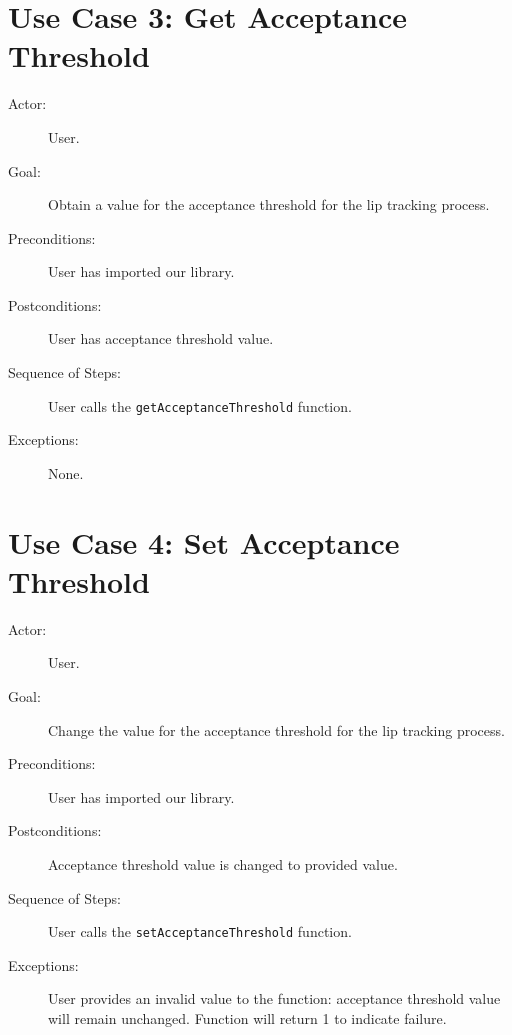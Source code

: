 \section{Use Case 3: Get Acceptance Threshold}

\begin{description}
  \item[Actor:] User.
  \item[Goal:] Obtain a value for the acceptance threshold for the lip tracking process.
  \item[Preconditions:] User has imported our library.
  \item[Postconditions:] User has acceptance threshold value.
  \item[Sequence of Steps:] User calls the \texttt{getAcceptanceThreshold} function.
  \item[Exceptions:] None.
\end{description}


\section{Use Case 4: Set Acceptance Threshold}

\begin{description}
  \item[Actor:] User.
  \item[Goal:] Change the value for the acceptance threshold for the lip tracking process.
  \item[Preconditions:] User has imported our library.
  \item[Postconditions:] Acceptance threshold value is changed to provided value.
  \item[Sequence of Steps:] User calls the \texttt{setAcceptanceThreshold} function.
  \item[Exceptions:] User provides an invalid value to the function: acceptance threshold value will remain unchanged. Function will return 1 to indicate failure.
\end{description}